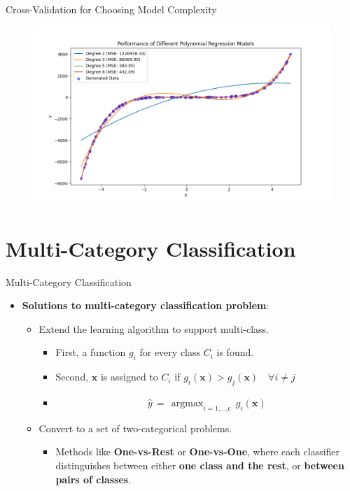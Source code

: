\documentclass[serif, aspectratio=169]{beamer}
\DeclareMathOperator*{\argmax}{argmax}
\begin{document}
\begin{frame}{Cross-Validation for Choosing Model Complexity}
    \begin{figure}
        \centering
        \includegraphics[width=0.8\linewidth]{pic/Figure_16.png}
    \end{figure}
\end{frame}

\section{Multi-Category Classification}

\begin{frame}{Multi-Category Classification}
    \begin{itemize}
        \item \textbf{Solutions to multi-category classification problem}:
        \medskip
        \begin{itemize}\itemsep1.5em
            \item Extend the learning algorithm to support multi-class.
            \medskip
            \begin{itemize}\itemsep1em
                \item First, a function \(g_i\) for every class \(C_i\) is found.
                \item Second, \(\mathbf{x}\) is assigned to \(C_i\) if \(g_i(\mathbf{x}) > g_j(\mathbf{x}) \quad \forall i \neq j\)
                \item[] \[\hat{y} \, = \, \argmax_{i=\text{1,...,c}} \, g_i(\mathbf{x})\]
            \end{itemize}
            \item Convert to a set of two-categorical problems.
            \medskip
            \begin{itemize}
                \item Methods like \textbf{One-vs-Rest} or \textbf{One-vs-One}, where each classifier distinguishes between either \textbf{one class and the rest}, or \textbf{between pairs of classes}.
            \end{itemize}
        \end{itemize}
    \end{itemize}
\end{frame}
\end{document}
